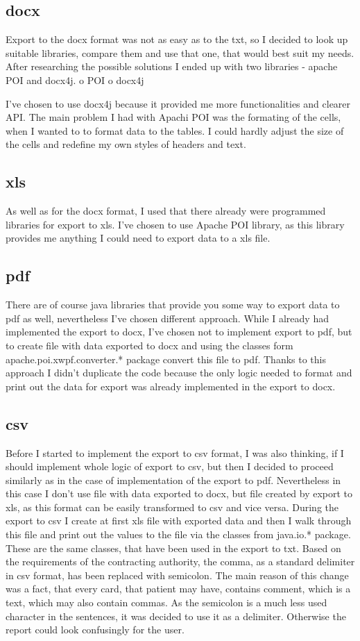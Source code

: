 \documentclass[thesis=B,english]{FITthesis}[2012/10/20]
\begin{document}
\subsection{docx}
Export to the docx format was not as easy as to the txt, so I decided to look up suitable libraries, compare them and use that one, that would best suit my needs. After researching the possible solutions I ended up with two libraries - apache POI and docx4j.
o POI
o docx4j

I've chosen to use docx4j because it provided me more functionalities and clearer API. The main problem I had with Apachi POI was the formating of the cells, when I wanted to to format data to the tables. I could hardly adjust the size of the cells and redefine my own styles of headers and text.
\subsection{xls}
As well as for the docx format, I used that there already were programmed libraries for export to xls.
I've chosen to use Apache POI library, as this library provides me anything I could need to export data to  a xls file.
\subsection{pdf}
There are of course java libraries that provide you some way to export data to pdf as well, nevertheless I've chosen different approach. While I already had implemented the export to docx, I've chosen not to implement export to pdf, but to create file with data exported to docx and using the classes form apache.poi.xwpf.converter.* package convert this file to pdf. Thanks to this approach I didn't duplicate the code because the only logic needed to format and print out the data for export was already implemented in the export to docx. 
\subsection{csv}
Before I started to implement the export to csv format, I was also thinking, if I should implement whole logic of export to csv, but then I decided to proceed similarly as in the case of implementation of the export to pdf. Nevertheless in this case I don't use file with data exported to docx, but file created by export to xls, as this format can be easily transformed to csv and vice versa. During the export to csv I create at first xls file with exported data and then I walk through this file and print out the values to the file via the classes from java.io.* package. These are the same classes, that have been used in the export to txt. Based on the requirements of the contracting authority, the comma, as a standard delimiter in csv format, has been replaced with semicolon. The main reason of this change was a fact, that every card, that patient may have, contains comment, which is a text, which may also contain commas. As the semicolon is a much less used character in the sentences, it was decided to use it as a delimiter. Otherwise the report could look confusingly for the user.
\end{document}
